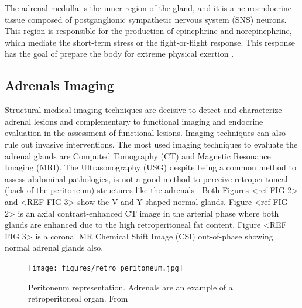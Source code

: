 \documentclass{article}
\begin{document}
The adrenal medulla is the inner region of the gland, and it is a neuroendocrine
tissue composed of postganglionic sympathetic nervous system (SNS) neurons. This
region is responsible for the production of epinephrine and norepinephrine,
which mediate the short-term stress or the fight-or-flight response. This
response has the goal of prepare the body for extreme physical exertion
\cite{open}.

\subsection{Adrenals Imaging}

Structural medical imaging techniques are decisive to detect and characterize
adrenal lesions and complementary to functional imaging and endocrine evaluation
in the assessment of functional lesions. Imaging techniques can also rule out
invasive interventions. The most used imaging techniques to evaluate the adrenal
glands are Computed Tomography (CT) and Magnetic Resonance Imaging (MRI). The
Ultrasonography (USG) despite being a common method to assess abdominal
pathologies, is not a good method to perceive retroperitoneal (back of the
peritoneum) structures like the adrenals \cite{Panda2015}. Both Figures <ref FIG
2> and <REF FIG 3> show the V and Y-shaped normal glands. Figure <ref FIG 2> is
an axial contrast-enhanced CT image in the arterial phase where both glands are
enhanced due to the high retroperitoneal fat content. Figure <REF FIG 3> is a
coronal MR Chemical Shift Image (CSI) out-of-phase showing normal adrenal glands
also.

\begin{figure}[htbp]
    \centering
    \texttt{[image: figures/retro\_peritoneum.jpg]}
    \caption{Peritoneum representation. Adrenals are an example of a retroperitoneal organ. From \cite{retroimg} }
    \label{fig: retro_per}
\end{figure}
\end{document}
